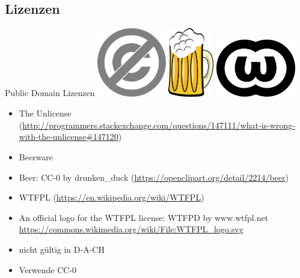 \subsection{Lizenzen}
\label{sec:lizenzen}
\subsectionframe

\begin{frame}{Public Domain Lizenzen}
	\includegraphics[height=3cm]{res/PD-icon.pdf}
	\hfill
	\includegraphics[height=3cm]{res/beer.pdf}
	\hfill
	\includegraphics[height=2.5cm]{res/WTFPL_logo.pdf}
\end{frame}
\note
{
	\begin{itemize}
		\item The Unlicense (\url{http://programmers.stackexchange.com/questions/147111/what-is-wrong-with-the-unlicense\#147120})
		\item Beerware
		\item Beer: CC-0 by drunken\_duck (\url{https://openclipart.org/detail/2214/beer})
		\item WTFPL (\url{https://en.wikipedia.org/wiki/WTFPL})
		\item An official logo for the WTFPL license: WTFPD by www.wtfpl.net \url{https://commons.wikimedia.org/wiki/File:WTFPL_logo.svg}
		\item nicht gültig in D-A-CH
		\item Verwende CC-0
	\end{itemize}
}

